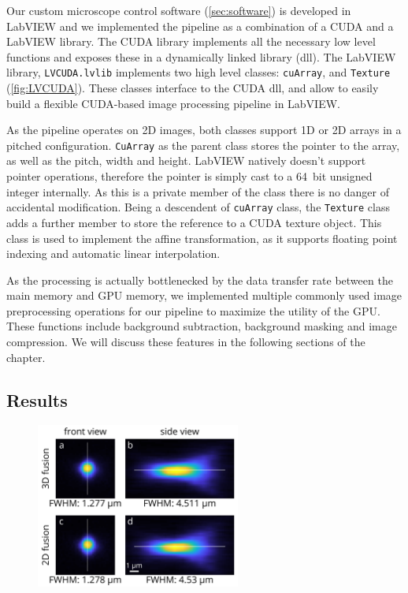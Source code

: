   Our custom microscope control software (\autoref{sec:software}) is developed in LabVIEW and we implemented the pipeline as a combination of a CUDA and a LabVIEW library. The CUDA library implements all the necessary low level functions and exposes these in a dynamically linked library (dll). The LabVIEW library, \texttt{LVCUDA.lvlib} implements two high level classes: \texttt{cuArray}, and \texttt{Texture} (\autoref{fig:LVCUDA}). These classes interface to the CUDA dll, and allow to easily build a flexible CUDA-based image processing pipeline in LabVIEW.

  As the pipeline operates on 2D images, both classes support 1D or 2D arrays in a pitched configuration. \texttt{CuArray} as the parent class stores the pointer to the array, as well as the pitch, width and height. LabVIEW natively doesn't support pointer operations, therefore the pointer is simply cast to a \SI{64}{bit} unsigned integer internally. As this is a private member of the class there is no danger of accidental modification. Being a descendent of \texttt{cuArray} class, the \texttt{Texture} class adds a further member to store the reference to a CUDA texture object. This class is used to implement the affine transformation, as it supports floating point indexing and automatic linear interpolation.

  As the processing is actually bottlenecked by the data transfer rate between the main memory and GPU memory, we implemented multiple commonly used image preprocessing operations for our pipeline to maximize the utility of the GPU. These functions include background subtraction, background masking and image compression. We will discuss these features in the following sections of the chapter. 

  


\subsection{Results} 

\begin{figure}
  \centering
  \includegraphics[width=0.6\textwidth]{fusion/beads/2Dvs3Dbeads}
  \label{fig:2Dvs3Dbeads}
\end{figure}


